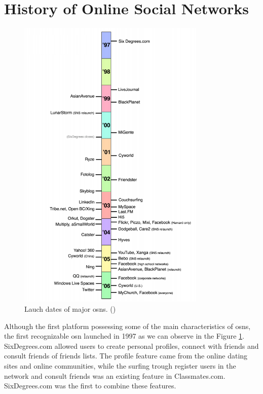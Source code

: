 \section{History of Online Social Networks}
\begin{figure}
\begin{center}
  \includegraphics[width=0.8\textwidth]{img/timeline.png}
\end{center}
\caption{\label{img:timeline} Lauch dates of major \glspl{osn}. (\cite{ellison2007social})}
\end{figure}

\indent \indent Although the first platform possessing some of the main characteristics of \glspl{osn},
the first recognizable \gls{osn} launched in 1997 as we can observe in the Figure \ref{img:timeline}. SixDegrees.com allowed users to create personal
profiles, connect with friends and consult friends of friends lists. The profile feature came from the
online dating sites and online communities, while the surfing trough register users in the network
and consult friends was an existing feature in Classmates.com. SixDegrees.com was the first to combine
these features.

